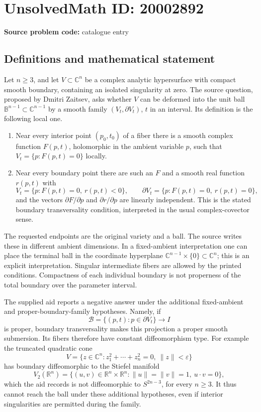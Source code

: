 \documentclass[11pt]{article}
\newcommand{\R}{\mathbb{R}}
\newcommand{\C}{\mathbb{C}}
\begin{document}
\section*{UnsolvedMath ID: 20002892}
\textbf{Source problem code:} catalogue entry
\subsection{Definitions and mathematical statement}
Let \(n\ge3\), and let \(V\subset\C^n\) be a complex analytic hypersurface with compact smooth boundary, containing an isolated singularity at zero. The source question, proposed by Dmitri Zaitsev, asks whether \(V\) can be deformed into the unit ball \(\mathbb B^{n-1}\subset\C^{n-1}\) by a smooth family \((V_t,\partial V_t)\), \(t\) in an interval. Its definition is the following local one.
\begin{enumerate}
\item Near every interior point \((p_0,t_0)\) of a fiber there is a smooth complex function \(F(p,t)\), holomorphic in the ambient variable \(p\), such that \(V_t=\{p:F(p,t)=0\}\) locally.
\item Near every boundary point there are such an \(F\) and a smooth real function \(r(p,t)\) with
\[
V_t=\{p:F(p,t)=0,\ r(p,t)<0\},\qquad
\partial V_t=\{p:F(p,t)=0,\ r(p,t)=0\},
\]
and the vectors \(\partial F/\partial p\) and \(\partial r/\partial p\) are linearly independent. This is the stated boundary transversality condition, interpreted in the usual complex-covector sense.
\end{enumerate}
The requested endpoints are the original variety and a ball. The source writes these in different ambient dimensions. In a fixed-ambient interpretation one can place the terminal ball in the coordinate hyperplane \(\C^{n-1}\times\{0\}\subset\C^n\); this is an explicit interpretation. Singular intermediate fibers are allowed by the printed conditions. Compactness of each individual boundary is not properness of the total boundary over the parameter interval.

The supplied aid reports a negative answer under the additional fixed-ambient and proper-boundary-family hypotheses. Namely, if
\[
\mathcal B=\{(p,t):p\in\partial V_t\}\longrightarrow I
\]
is proper, boundary transversality makes this projection a proper smooth submersion. Its fibers therefore have constant diffeomorphism type. For example the truncated quadratic cone
\[
V=\{z\in\C^n:z_1^2+\cdots+z_n^2=0,\ \|z\|<\varepsilon\}
\]
has boundary diffeomorphic to the Stiefel manifold
\[
V_2(\R^n)=\{(u,v)\in\R^n\times\R^n:\|u\|=\|v\|=1,\ u\cdot v=0\},
\]
which the aid records is not diffeomorphic to \(S^{2n-3}\), for every \(n\ge3\). It thus cannot reach the ball under these additional hypotheses, even if interior singularities are permitted during the family.
\end{document}
